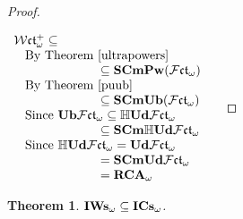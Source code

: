 \documentclass{article}
\theoremstyle{defin}
\theoremstyle{theorem}
\newtheorem{theorem}{Theorem}
\theoremstyle{claim}
\theoremstyle{prop}
\theoremstyle{lemma}
\theoremstyle{fact}
\theoremstyle{remark}
\theoremstyle{ex}
\theoremstyle{col}
\theoremstyle{question}
\begin{document}
\begin{proof}
$ $

$\begin{array}{lll}
\mathcal{W}\mathfrak{ct}_{\omega}^+ \subseteq & \\
\:\:\:\: \text{By Theorem~\ref{ultrapowers}} & \\
\:\:\:\:\:\:\:\:\:\:\:\:\:\:\:\:\:\:\:\:\:\:\:\:\:\:\:\:\:\:\: \subseteq {\bf S Cm Pw}(\mathcal{F}\mathfrak{ct}_{\omega}) & \\
\:\:\:\: \text{By Theorem~\ref{puub}} & \\
\:\:\:\:\:\:\:\:\:\:\:\:\:\:\:\:\:\:\:\:\:\:\:\:\:\:\:\:\:\:\: \subseteq {\bf S Cm Ub}(\mathcal{F}\mathfrak{ct}_{\omega}) & \\
\:\:\:\: \text{Since ${\bf Ub} \mathcal{F}\mathfrak{ct}_{\omega} \subseteq \mathbb{H}{\bf Ud} \mathcal{F}\mathfrak{ct}_{\omega} $} & \\
\:\:\:\:\:\:\:\:\:\:\:\:\:\:\:\:\:\:\:\:\:\:\:\:\:\:\:\:\:\:\: \subseteq {\bf S Cm} \mathbb{H}{\bf Ud}\mathcal{F}\mathfrak{ct}_{\omega} & \\
\:\:\:\: \text{Since $\mathbb{H}{\bf Ud} \mathcal{F}\mathfrak{ct}_{\omega} = {\bf Ud} \mathcal{F}\mathfrak{ct}_{\omega}$} & \\
\:\:\:\:\:\:\:\:\:\:\:\:\:\:\:\:\:\:\:\:\:\:\:\:\:\:\:\:\:\:\: = {\bf S Cm} {\bf Ud}\mathcal{F}\mathfrak{ct}_{\omega} & \\
\:\:\:\:\:\:\:\:\:\:\:\:\:\:\:\:\:\:\:\:\:\:\:\:\:\:\:\:\:\:\: = {\bf RCA}_{\omega}& \\
\end{array}$
\end{proof}

\begin{theorem}
${\bf IWs}_{\omega} \subseteq {\bf ICs}_{\omega}$.
\end{theorem}
\end{document}
